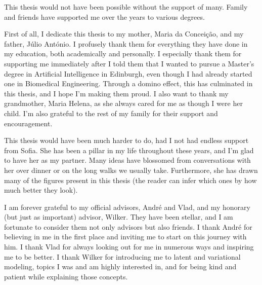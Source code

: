 \begin{acknowledgments}

    This thesis would not have been possible without the support of
    many. Family and friends have supported me over
    the years to various degrees.
    
    First of all, I dedicate this thesis to my mother, Maria da
    Conceição, and my father, Júlio António. I profusely thank them
    for everything they have done in my education, both academically
    and personally. I especially thank them for supporting me
    immediately after I told them that I wanted to pursue a Master's
    degree in Artificial Intelligence in Edinburgh, even though I had
    already started one in Biomedical Engineering. Through a domino
    effect, this has culminated in this thesis, and I hope I'm making
    them proud. I also want to thank my grandmother, Maria Helena, as she
    always cared for me as though I were her child. I'm also grateful
    to the rest of my family for their support and encouragement.
    
    This thesis would have been much harder to do, had I not had
    endless support from Sofia. She has been a pillar in my life
    throughout these years, and I'm glad to have her as my partner.
    Many ideas have blossomed from conversations with her over dinner
    or on the long walks we usually take. Furthermore, she has drawn
    many of the figures present in this thesis (the reader can infer
    which ones by how much better they look).
    
    I am forever grateful to my official advisors, André and Vlad,
    and my honorary (but just as important) advisor, Wilker. They
    have been stellar, and I am fortunate to consider them not only
    advisors but also friends. I thank André for believing in me in
    the first place and inviting me to start on this journey with
    him. I thank Vlad for always looking out for me in numerous ways
    and inspiring me to be better. I thank Wilker for introducing me
    to latent and variational modeling, topics I was and am highly
    interested in, and for being kind and patient while explaining
    those concepts.
    

\end{acknowledgments}
